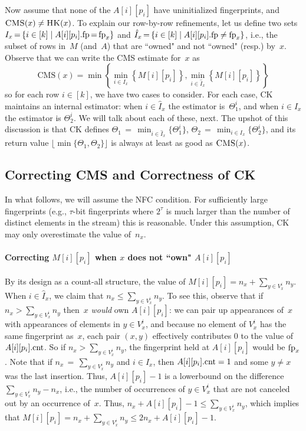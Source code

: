 Now assume that none of the $A[i][p_i]$ have uninitialized fingerprints, and $\textnormal{\textsc{CMS}}(x) \neq \textnormal{\textsc{HK}}(x)$. To explain our row-by-row refinements, let us define two sets  
$I_x\,{=}\,\{i \in [k] \;|\; A[i][p_i].\textup{fp}\,{=}\,\textup{fp}_x \}$ and $\hat{I}_x\,{=}\,\{i \in [k] \;|\; A[i][p_i].\textup{fp} \neq \textup{fp}_x \}$, 
i.e., the subset of rows in~$M$ (and~$A$) that are ``owned" and not ``owned" (resp.) by~$x$.  
Observe that we can write the CMS estimate for~$x$ as
\[
\mathrm{CMS}(x)
=\min \left\{    
\min_{i \in I_x}\left\{M[i][p_i]  \right\},
\min_{i \in \hat{I}_x}\left\{M[i][p_i]  \right\}
\right\}
\]
so for each row $i\in[k]$, we have two cases to consider.  For each case, CK maintains an internal estimator: when $i \in \hat{I}_x$ the estimator is~$\Theta^i_1$, and when $i \in I_x$ the estimator is $\Theta^i_2$.  We will talk about each of these, next. The upshot of this discussion is that CK defines $\Theta_1\,{=}\,\min_{i \in \hat{I}_x}\{\Theta^i_1\}$, $\Theta_2\,{=}\,\min_{i \in I_x}\{\Theta^i_2\}$, and its return value $\lfloor\min\{\Theta_1,\Theta_2\}\rfloor$ is always at least as good as $\textnormal{\textsc{CMS}}(x)$.  
 

\subsection{Correcting CMS and Correctness of CK}
In what follows, we will assume the NFC condition. For sufficiently large fingerprints (e.g., $\tau$-bit fingerprints where $2^\tau$ is much larger than the number of distinct elements in the stream) this is reasonable.  Under this assumption, CK may only overestimate the value of~$n_x$.

\paragraph{Correcting ${M[i][p_i]}$ when ${x}$ does not ``own" ${A[i][p_i]}$}
By its design as a count-all structure, the value of $M[i][p_i]=n_x + \sum_{y \in V^i_x}n_y$.  When $i \in \hat{I}_x$, we claim that $n_x \leq \sum_{y \in V^i_x}n_y$.  To see this, observe that if $n_x > \sum_{y \in V^i_x}n_y$ then~$x$ \emph{would} own $A[i][p_i]$: we can pair up appearances of~$x$ with appearances of elements in $y \in V^i_x$, and because no element of $V^i_x$ has the same fingerprint as~$x$, each pair $(x,y)$ effectively contributes 0 to the value of $A[i][p_i].\textup{cnt}$. So if $n_x > \sum_{y \in V^i_x}n_y$, the fingerprint held at $A[i][p_i]$ would be $\textup{fp}_x$.  Note that if $n_x\,{=}\,\sum_{y \in V^i_x}n_y$ and $i \in \hat{I}_x$, then $A[i][p_i].\textup{cnt}=1$ and some $y \neq x$ was the last insertion.  Thus, $A[i][p_i]-1$ is a lowerbound on the difference $\sum_{y \in V^i_x}n_y - n_x$, i.e., the number of occurrences of $y \in V^i_x$ that are not canceled out by an occurrence of~$x$.  Thus, $n_x + A[i][p_i]-1 \leq \sum_{y \in V^i_x}n_y$, which implies that $M[i][p_i]=n_x + \sum_{y \in V^i_x}n_y \leq 2n_x + A[i][p_i]-1$.
%

